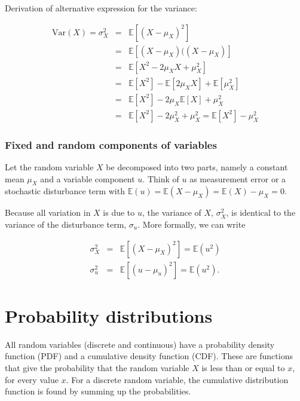 Derivation of alternative expression for the variance:

\begin{eqnarray}
\textrm{Var}(X) = \sigma^{2}_{X} &=& \mathbb{E}[(X-\mu_{X})^{2}]\nonumber \\
&=& \mathbb{E}[(X-\mu_{X})((X-\mu_{X})] \nonumber\\
&=& \mathbb{E}[X^{2}-2\mu_{X}X + \mu_{X}^{2}] \nonumber\\
&=& \mathbb{E}[X^{2}] -\mathbb{E}[2\mu_{X}X] + \mathbb{E}[\mu_{X}^{2}] \nonumber\\
&=& \mathbb{E}[X^{2}] -2\mu_{X}\mathbb{E}[X] + \mu_{X}^{2} \nonumber\\
&=& \mathbb{E}[X^{2}] -2\mu_{X}^{2} + \mu_{X}^{2} = \mathbb{E}[X^{2}] - \mu_{X}^{2}
\end{eqnarray}

\subsubsection{Fixed and random components of variables}
Let the random variable $X$ be decomposed into two parts, namely a constant mean $\mu_{X}$ and a variable component $u$. Think of $u$ as measurement error or a stochastic disturbance term with $\mathbb{E}(u)= \mathbb{E}(X-\mu_{X}) = \mathbb{E}(X) -\mu_{X}= 0$.

Because all variation in $X$ is due to $u$, the variance of $X$, $\sigma^{2}_{X}$, is identical to the variance of the disturbance term, $\sigma_{u}$. More formally, we can write

\begin{eqnarray*}
\sigma^{2}_{X}&=& \mathbb{E}[(X-\mu_{X})^{2}] = \mathbb{E}(u^{2})\\
\sigma^{2}_{u}&=& \mathbb{E}[(u-\mu_{u})^{2}] = \mathbb{E}(u^{2}).
\end{eqnarray*}

\section{Probability distributions}
All random variables (discrete and continuous) have a probability density function (PDF) and a cumulative density function (CDF). These are functions that give the probability that the random variable $X$ is less than or equal to $x$, for every value $x$. For a discrete random variable, the cumulative distribution function is found by summing up the probabilities.


